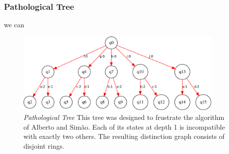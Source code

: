 \subsubsection{Pathological Tree}

we can 

\begin{figure}
\centering
\includegraphics[width=4in]{big_patho_tree.pdf} 
\caption{\emph{Pathological Tree} 
This tree was designed to frustrate the algorithm of Alberto and Sim\~ao.
Each of its states at depth 1 is incompatible with exactly two others.  
The resulting distinction graph consists of disjoint rings.
}
\end{figure}



